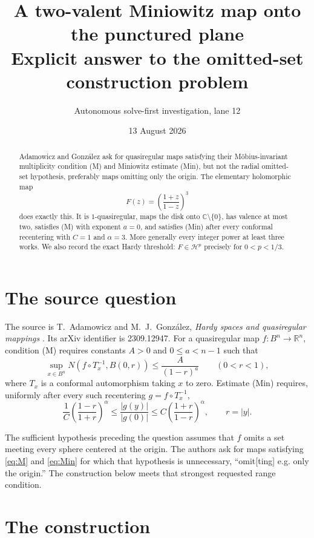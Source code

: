\documentclass[10pt]{article}
\title{A two-valent Miniowitz map onto the punctured plane\\
\large Explicit answer to the omitted-set construction problem}
\author{Autonomous solve-first investigation, lane 12}
\date{13 August 2026}
\newcommand{\C}{\mathbb C}
\newcommand{\Hp}{\mathcal H^p}
\begin{document}
\maketitle

\begin{abstract}
Adamowicz and Gonz\'alez ask for quasiregular maps satisfying their
M\"obius-invariant multiplicity condition (M) and Miniowitz estimate (Min),
but not the radial omitted-set hypothesis, preferably maps omitting only the
origin.  The elementary holomorphic map
\[
 F(z)=\left(\frac{1+z}{1-z}\right)^3
\]
does exactly this.  It is $1$-quasiregular, maps the disk onto
$\C\setminus\{0\}$, has valence at most two, satisfies (M) with exponent
$a=0$, and satisfies (Min) after every conformal recentering with $C=1$ and
$\alpha=3$.  More generally every integer power at least three works.  We
also record the exact Hardy threshold: $F\in\Hp$ precisely for $0<p<1/3$.
\end{abstract}

\section{The source question}

The source is T.~Adamowicz and M.~J.~Gonz\'alez, \emph{Hardy spaces and
quasiregular mappings} \cite{AG}.  Its arXiv identifier is 2309.12947.  For a quasiregular map
$f:B^n\to\mathbb R^n$, condition (M) requires constants $A>0$ and
$0\le a<n-1$ such that
\begin{equation}\label{eq:M}
 \sup_{x\in B^n}N(f\circ T_x^{-1},B(0,r))
 \le \frac{A}{(1-r)^a}\qquad(0<r<1),
\end{equation}
where $T_x$ is a conformal automorphism taking $x$ to zero.  Estimate (Min)
requires, uniformly after every such recentering $g=f\circ T_x^{-1}$,
\begin{equation}\label{eq:Min}
 \frac1C\left(\frac{1-r}{1+r}\right)^\alpha
 \le \frac{|g(y)|}{|g(0)|}
 \le C\left(\frac{1+r}{1-r}\right)^\alpha,
 \qquad r=|y|.
\end{equation}

The sufficient hypothesis preceding the question assumes that $f$ omits a
set meeting every sphere centered at the origin.  The authors ask for maps
satisfying \eqref{eq:M} and \eqref{eq:Min} for which that hypothesis is
unnecessary, ``omit[ting] e.g. only the origin.''  The construction below
meets that strongest requested range condition.

\section{The construction}
\end{document}
